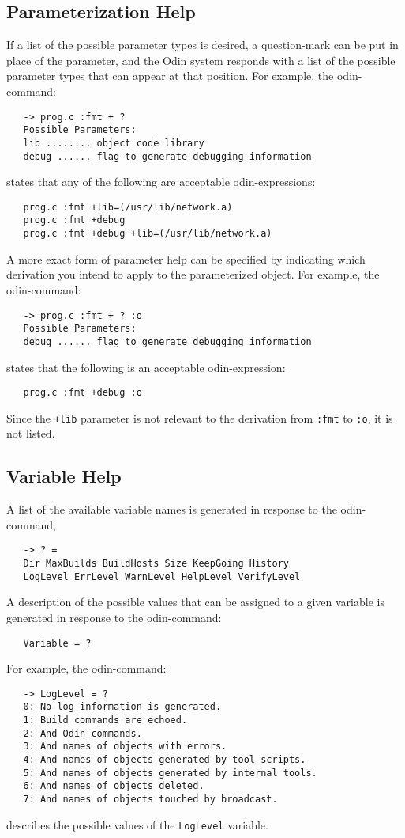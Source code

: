 \documentclass[hidelinks]{report}
\newcommand{\ex}{\tt}   %
\begin{document}
\subsection{Parameterization Help}

If a list of the possible parameter types is desired,
a question-mark can be put in place of the parameter,
and the Odin system responds with a list of the possible
parameter types that can appear at that position.
For example, the odin-command:
\begin{verbatim}
   -> prog.c :fmt + ?
   Possible Parameters:
   lib ........ object code library
   debug ...... flag to generate debugging information
\end{verbatim}
states that any of the following are acceptable odin-expressions:
\begin{verbatim}
   prog.c :fmt +lib=(/usr/lib/network.a)
   prog.c :fmt +debug
   prog.c :fmt +debug +lib=(/usr/lib/network.a)
\end{verbatim}

A more exact form of parameter help can be specified by indicating
which derivation you intend to apply to the parameterized object.
For example, the odin-command:
\begin{verbatim}
   -> prog.c :fmt + ? :o
   Possible Parameters:
   debug ...... flag to generate debugging information
\end{verbatim}
states that the following is an acceptable odin-expression:
\begin{verbatim}
   prog.c :fmt +debug :o
\end{verbatim}
Since the {\ex +lib} parameter is not relevant to the derivation
from {\ex :fmt} to {\ex :o}, it is not listed.

\subsection{Variable Help}

A list of the available variable names is generated in response
to the odin-command,
\begin{verbatim}
   -> ? =
   Dir MaxBuilds BuildHosts Size KeepGoing History
   LogLevel ErrLevel WarnLevel HelpLevel VerifyLevel
\end{verbatim}
A description of the possible values that can be assigned to a
given variable is generated in response to the odin-command:
\begin{verbatim}
   Variable = ?
\end{verbatim}
For example, the odin-command:
\begin{verbatim}
   -> LogLevel = ?
   0: No log information is generated.
   1: Build commands are echoed.
   2: And Odin commands.
   3: And names of objects with errors.
   4: And names of objects generated by tool scripts.
   5: And names of objects generated by internal tools.
   6: And names of objects deleted.
   7: And names of objects touched by broadcast.
\end{verbatim}
describes the possible values of the {\ex LogLevel} variable.
\end{document}
